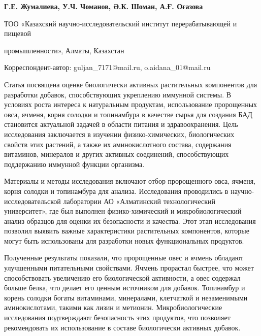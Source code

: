 
\begin{articleheader}

{\bfseries
Г.Е. Жумалиева\textsuperscript{\envelope },
У.Ч. Чоманов,
Ә.К. Шоман,
А.Ғ. Оғазова\textsuperscript{\envelope }
}
\end{articleheader}

\begin{affiliation}
ТОО «Казахский научно-исследовательский институт перерабатывающей и
пищевой

промышленности», Алматы, Казахстан

\raggedright \textsuperscript{\envelope }Корреспондент-автор: guljan\_7171@mail.ru,
o.aidana\_01@mail.ru
\end{affiliation}

Статья посвящена оценке биологически активных растительных компонентов
для разработки добавок, способствующих укреплению иммунной системы. В
условиях роста интереса к натуральным продуктам, использование
пророщенных овса, ячменя, корня солодки и топинамбура в качестве сырья
для создания БАД становится актуальной задачей в области питания и
здравоохранения. Цель исследования заключается в изучении
физико-химических, биологических свойств этих растений, а также их
аминокислотного состава, содержания витаминов, минералов и других
активных соединений, способствующих поддержанию иммунной функции
организма.

Материалы и методы исследования включают отбор пророщенного овса,
ячменя, корня солодки и топинамбура для анализа. Исследования
проводились в научно-исследовательской лаборатории АО «Алматинский
технологический университет», где был выполнен физико-химический и
микробиологический анализ образцов для оценки их безопасности и
качества. Этот этап исследования позволил выявить важные характеристики
растительных компонентов, которые могут быть использованы для разработки
новых функциональных продуктов.

Полученные результаты показали, что пророщенные овес и ячмень обладают
улучшенными питательными свойствами. Ячмень прорастал быстрее, что может
способствовать увеличению его биологической активности, а овес содержал
больше белка, что делает его ценным источником для добавок. Топинамбур и
корень солодки богаты витаминами, минералами, клетчаткой и незаменимыми
аминокислотами, такими как лизин и метионин. Микробиологические
исследования подтверждают безопасность этих продуктов, что позволяет
рекомендовать их использование в составе биологически активных добавок.

